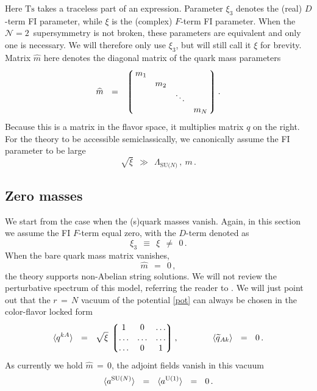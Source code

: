 \documentclass[12pt]{article}
\def\beq{\begin{equation}}
\def\eeq{\end{equation}}
\newcommand{\ntwo}{${\mathcal N}=2$}
\newcommand{\wt}{\widetilde}
\newcommand{\lgr}{\left\lgroup}
\newcommand{\rgr}{\right\rgroup}
\newcommand{\LN}{\Lambda_\text{SU($N$)}}
\newcommand{\aU}{a^{\rm U(1)}}
\newcommand{\aN}{a^\text{SU($N$)}}
\newcommand{\qt}{\wt{q}}
\newcommand{\Ts}{\text{Ts}}
\newcommand{\mhat}{\widehat{m}}
\begin{document}
	Here $ \Ts $ takes a traceless part of an expression.
	Parameter $ \xi_3 $ denotes the (real) $ D $-term FI parameter, while $ \xi $ is the (complex) $ F $-term FI parameter.
	When the \ntwo\, supersymmetry is not broken, these parameters are equivalent and only one is necessary.
	We will therefore only use $ \xi_3 $, but will still call it $ \xi $ for brevity.
	Matrix $ \mhat $ here denotes the diagonal matrix of the quark mass parameters
\beq
	\mhat    ~~=~~    \lgr\, \begin{matrix}
			          m_1  &       &        &       \\
				       &  m_2  &        &       \\
				       &       & \ddots &       \\
                                       &       &        &  m_N  
			         \end{matrix} \,\rgr
	.
\eeq
	Because this is a matrix in the flavor space, it multiplies matrix $ q $ on the right.
	For the theory to be accessible semiclassically, we canonically assume the FI parameter to be large
\[
	\sqrt{\xi}    ~~\gg~~    \LN\,,~  m \,.
\]


\subsection{Zero masses}
	We start from the case when the (s)quark masses vanish.
	Again, in this section we assume the FI $ F $-term equal zero, with the $ D $-term denoted as
\[
	\xi_3    ~~\equiv~~    \xi    ~~\neq~~    0\,.
\]
	When the bare quark mass matrix vanishes,
\[
	\mhat    ~~=~~    0\,,
\]
	the theory supports non-Abelian string solutions.
	We will not   review  the perturbative spectrum of this model, referring the reader to \cite{SYrev}.
	We will just point out that the $ r \,=\, N $ vacuum of the potential \eqref{pot} can always be chosen
	in the color-flavor locked form
\beq
\label{qvac}
	\langle q^{kA} \rangle    ~~=~~    \sqrt{\xi}\, 
		\lgr \begin{matrix}
		     		   1    &    0     &    \ldots  \\
				\ldots  &  \ldots  &    \ldots  \\
				\ldots  &    0     &       1
		     \end{matrix} \rgr,
	\qquad\qquad
	\langle \qt{}_{Ak} \rangle    ~~=~~    0\,.
\eeq
	As currently we hold $ \mhat \,=\, 0 $, the adjoint fields vanish in this vacuum
\beq
	\langle \aN \rangle    ~~=~~    \langle \aU \rangle    ~~=~~    0\,.
\eeq
\end{document}

